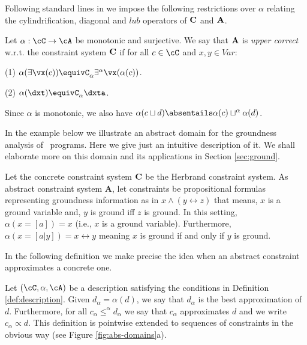 \documentclass{tlp}
\begin{document}
Following standard lines in \cite{DBLP:journals/jlp/GiacobazziDL95,Falaschi:97:TCS,ZaffanellaGL97}  we impose the following restrictions over $\alpha$ relating  the cylindrification, diagonal and $lub$ operators of ${\bf C}$ and ${\bf A}$. 


\begin{definition}[Correctness]\label{dec:corapp}
Let $\alpha : \cC \to \cA$ be monotonic and surjective. We say that ${\bf A}$ is \emph{upper correct} w.r.t. the constraint system 
 ${\bf C} $ if for all $c\in \cC$ and $x,y \in Var$:

\noindent (1)  $\alpha(\exists \vx (c)) \equivC_\alpha \exists^\alpha \vx (\alpha(c))$.

\noindent (2) $\alpha(\dxt) \equivC_\alpha \dxta$. 


Since $\alpha$ is monotonic, we also have $\alpha(c \sqcup d) \absentails \alpha(c) \sqcup^\alpha \alpha(d)$. 


\end{definition}



In the example below we illustrate an abstract domain for the groundness analysis of \tccp\ programs. Here we give just an intuitive description of it. We shall elaborate more on this domain and its applications in  Section \ref{sec:ground}.
 
\begin{example}\label{ex:hcs}
Let the concrete constraint system ${\bf C}$ be the  Herbrand constraint system. As abstract constraint system {\bf A}, let constraints be propositional formulas 
 representing groundness information as in  $x \wedge (y \leftrightarrow z)$ that means, $x$ is a ground variable and,  $y$ is ground iff $z$ is ground. In this setting,  $\alpha(x=[a])= x$ (i.e., $x$ is a ground variable). Furthermore, $\alpha(x=[a | y]) = x \leftrightarrow y$ meaning $x$ is ground if and only if $y$ is ground. 


\end{example}

In the following definition we  make precise the idea  when an  abstract constraint   approximates a concrete one. 

\begin{definition}[Approximations]\label{def:approximations}
Let $(\cC, \alpha,  \cA)$ be a description  satisfying the conditions in Definition \ref{def:description}.   Given $d_{\alpha} = \alpha(d)$, we say that $d_{\alpha}$ is the best approximation of $d$. Furthermore, for all $c_{\alpha} \leq^\alpha d_{\alpha}$ we say that $c_{\alpha}$ approximates $d$ and we write $c_{\alpha} \propto d$.  This definition is pointwise extended  to sequences of constraints in the obvious way (see Figure \ref{fig:abs-domains}a). 


\end{definition}
\end{document}
